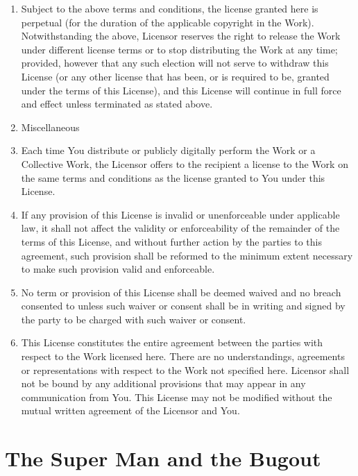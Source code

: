 \begin{enumerate}[1.]
\item
  Subject to the above terms and conditions, the license granted here
  is perpetual (for the duration of the applicable copyright in the
  Work). Notwithstanding the above, Licensor reserves the right to
  release the Work under different license terms or to stop
  distributing the Work at any time; provided, however that any such
  election will not serve to withdraw this License (or any other
  license that has been, or is required to be, granted under the
  terms of this License), and this License will continue in full
  force and effect unless terminated as stated above.

\item
  Miscellaneous

\item
  Each time You distribute or publicly digitally perform the Work or
  a Collective Work, the Licensor offers to the recipient a license
  to the Work on the same terms and conditions as the license granted
  to You under this License.

\item
  If any provision of this License is invalid or unenforceable under
  applicable law, it shall not affect the validity or enforceability
  of the remainder of the terms of this License, and without further
  action by the parties to this agreement, such provision shall be
  reformed to the minimum extent necessary to make such provision
  valid and enforceable.

\item
  No term or provision of this License shall be deemed waived and no
  breach consented to unless such waiver or consent shall be in
  writing and signed by the party to be charged with such waiver or
  consent.

\item
  This License constitutes the entire agreement between the parties
  with respect to the Work licensed here. There are no
  understandings, agreements or representations with respect to the
  Work not specified here. Licensor shall not be bound by any
  additional provisions that may appear in any communication from
  You. This License may not be modified without the mutual written
  agreement of the Licensor and You.

\end{enumerate}

\section{The Super Man and the Bugout}

